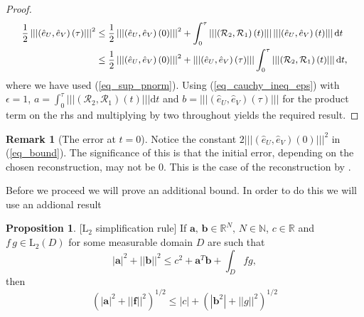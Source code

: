 \documentclass[12pt,a4paper]{article}
\numberwithin{equation}{section}
\theoremstyle{definition}
\newcommand{\pnorm}[1]{\left|\left|\left|#1\right|\right|\right|}
\newcommand{\norm}[1]{\left|#1\right|}
\newcommand{\Norm}[1]{\left|\left|#1\right|\right|}
\newcommand{\vect}[1]{\textbf{#1}}
\newcommand{\leb}{\text{L}}
\newcommand{\qp}[1]{\left(#1\right)}
\newtheorem{Proposition}[subsection]{Proposition}
\newtheorem{Rem}[subsection]{Remark}
\begin{document}
\begin{proof}
\begin{equation}
\small
\begin{aligned}
\frac{1}{2}\pnorm{\qp{\hat{e}_U, \hat{e}_V}\qp{\tau}}^2&\leq
\frac{1}{2}\pnorm{\qp{\hat{e}_U, \hat{e}_V}\qp{0}}^2
+\int_0^\tau\pnorm{\qp{\mathcal{R}_2,\mathcal{R}_1}\qp{t}} \pnorm{\qp{\hat{e}_U,\hat{e}_V}\qp{t}}\mathrm{d}t\\
&\leq \frac{1}{2}\pnorm{\qp{\hat{e}_U, \hat{e}_V}\qp{0}}^2
+\pnorm{\qp{\hat{e}_U,\hat{e}_V}\qp{\tau}}\int_0^\tau\pnorm{\qp{\mathcal{R}_2,\mathcal{R}_1}\qp{t}} \mathrm{d}t,
\end{aligned}
\end{equation}
where we have used (\ref{eq_sup_pnorm}).
Using (\ref{eq_cauchy_ineq_eps}) with $\epsilon=1$, $a=\int_0^\tau\pnorm{\qp{\mathcal{R}_2,\mathcal{R}_1}\qp{t}} \mathrm{d}t$ and $b=\pnorm{\qp{\hat{e}_U,\hat{e}_V}\qp{\tau}}$ for the product term on the rhs and multiplying by two throughout yields the required result.
\end{proof}

\begin{Rem}[The error at $t=0$]
	Notice the constant $2\pnorm{\qp{\hat{e}_U,\hat{e}_V}\qp{0}}^2$ in (\ref{eq_bound}).  The significance of this is that the initial error, depending on the chosen reconstruction, may not be $0$.  This is the case of the reconstruction by \cite{georgoulis2016posteriori}.
\end{Rem}

Before we proceed we will prove an additional bound.  In order to do this we will use an addional result
\begin{Proposition}\label{lemma:L2_simplification}[$\leb_2$ simplification rule] If $\vect{a},\, \vect{b}\in \mathbb{R}^N,\, N\in \mathbb{N}$, $c\in \mathbb{R}$ and $f\,g \in \leb_2\qp{D}$ for some measurable domain $D$ are such that 
	\begin{equation*}
\norm{\vect{a}}^2 +\Norm{\vect{b}}^2\leq c^2+\vect{a}^T\vect{b}+\int_D fg,
 	\end{equation*}
then
\begin{equation}
\qp{\norm{\vect{a}}^2 +\Norm{\vect{f}}^2}^{1/2}\leq \norm{c}+\qp{\norm{\vect{b}^2}+\Norm{g}^2}^{1/2}
\end{equation}
\end{Proposition}
\end{document}

